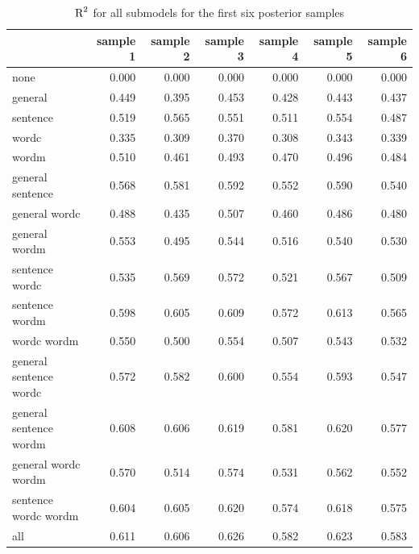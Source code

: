 \documentclass[11pt,a4paper,twoside]{book}\usepackage[]{graphicx}\usepackage[]{color}
\newenvironment{knitrout}{}{} %
\begin{document}
\begin{knitrout}
\color{fgcolor}\begin{table}

\caption{\label{tab:empirical.data.postsample3}$ \text{R}^2$ for all submodels for the first six posterior samples}
\centering
\begin{tabular}[t]{lrrrrrr}
\toprule
  & sample 1 & sample 2 & sample 3 & sample 4 & sample 5 & sample 6\\
\midrule
none & 0.000 & 0.000 & 0.000 & 0.000 & 0.000 & 0.000\\
general & 0.449 & 0.395 & 0.453 & 0.428 & 0.443 & 0.437\\
sentence & 0.519 & 0.565 & 0.551 & 0.511 & 0.554 & 0.487\\
wordc & 0.335 & 0.309 & 0.370 & 0.308 & 0.343 & 0.339\\
wordm & 0.510 & 0.461 & 0.493 & 0.470 & 0.496 & 0.484\\
general sentence & 0.568 & 0.581 & 0.592 & 0.552 & 0.590 & 0.540\\
general wordc & 0.488 & 0.435 & 0.507 & 0.460 & 0.486 & 0.480\\
general wordm & 0.553 & 0.495 & 0.544 & 0.516 & 0.540 & 0.530\\
sentence wordc & 0.535 & 0.569 & 0.572 & 0.521 & 0.567 & 0.509\\
sentence wordm & 0.598 & 0.605 & 0.609 & 0.572 & 0.613 & 0.565\\
wordc wordm & 0.550 & 0.500 & 0.554 & 0.507 & 0.543 & 0.532\\
general sentence wordc & 0.572 & 0.582 & 0.600 & 0.554 & 0.593 & 0.547\\
general sentence wordm & 0.608 & 0.606 & 0.619 & 0.581 & 0.620 & 0.577\\
general wordc wordm & 0.570 & 0.514 & 0.574 & 0.531 & 0.562 & 0.552\\
sentence wordc wordm & 0.604 & 0.605 & 0.620 & 0.574 & 0.618 & 0.575\\
all & 0.611 & 0.606 & 0.626 & 0.582 & 0.623 & 0.583\\
\bottomrule
\end{tabular}
\end{table}


\end{knitrout}
\end{document}
